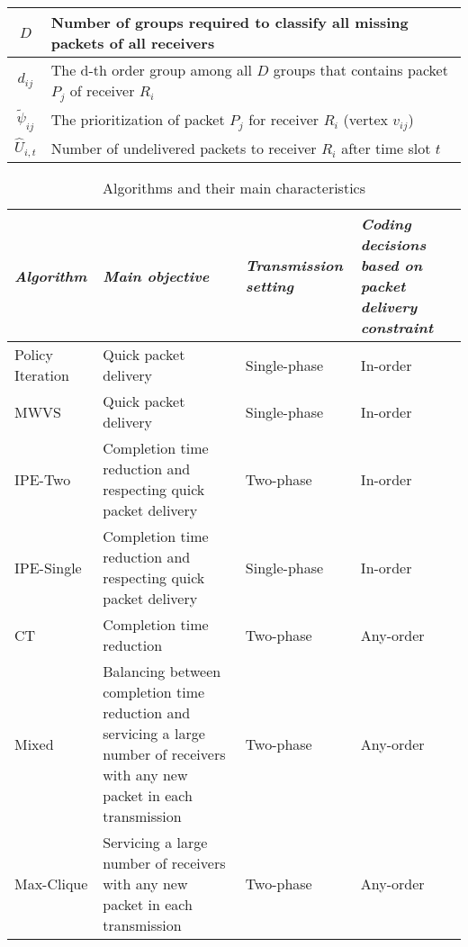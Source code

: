 \documentclass[12pt, peerreview, onecolumn]{IEEEtran}
\begin{document}
\begin{table}
\begin{tabular}{|c| p{15.5cm}|}
    $D$ & Number of groups required to classify all missing packets  of all receivers \\ \hline
    $d_{ij}$ & The d-th order  group among all $D$ groups that contains packet $P_j$ of receiver $R_i$   \\ \hline
    $\tilde{\psi}_{ij}$ & The prioritization of packet $P_j$ for receiver $R_i$ (vertex $v_{ij}$)\\ \hline
    $\hat{U}_{i,t} $ &  Number of undelivered  packets to receiver $R_i$ after time slot $t$ \\ \hline
    \end{tabular}
\end{table}


\begin{table}\caption{Algorithms and their main characteristics}
 \centering
    \begin{tabular}{|l|p{6cm} |p{2.4cm}  |p{4cm} |}
    \hline
    \textit{Algorithm} &  \textit{Main objective} &  \textit{Transmission setting} &  \textit{Coding decisions based on packet delivery constraint} \\ \hline
    Policy Iteration & Quick packet delivery  &  Single-phase  & In-order \\ \hline
    MWVS & Quick packet delivery &  Single-phase  & In-order \\ \hline
    IPE-Two \cite{wanginstantly} & Completion time reduction  and respecting quick packet delivery &  Two-phase  & In-order \\ \hline
    IPE-Single & Completion time reduction and respecting quick packet delivery &  Single-phase  & In-order \\ \hline
    CT \cite{sorour2012completion}& Completion time reduction &  Two-phase  &Any-order \\ \hline
    Mixed \cite{aboutorabenabling}& Balancing between  completion time reduction and servicing a large number of receivers with any new packet in each transmission&  Two-phase  &Any-order \\ \hline
    Max-Clique \cite{le2013instantly}& Servicing a large  number of receivers with any new packet in each transmission&  Two-phase  & Any-order \\ \hline

    \end{tabular}
\end{table}
\end{document}
